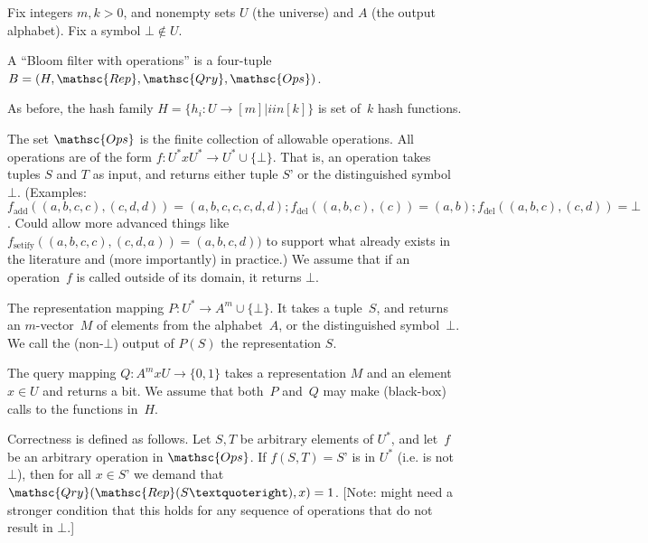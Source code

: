 
Fix integers $m,k > 0$, and nonempty sets $U$ (the universe) and $A$ (the output alphabet).  Fix a symbol $\bot \not\in U$.  

A “Bloom filter with operations” is a four-tuple  $B=(H,\mathsc{Rep},\mathsc{Qry}, \mathsc{Ops})$.  

As before, the hash family $H = \{h_i : U \rightarrow [m]  | i in [k] \}$ is  set of~$k$ hash functions.  

The set $\mathsc{Ops}$ is the finite collection of allowable operations.  All operations are of the form 
$f: U^* x U^* \rightarrow U^* \cup \{\bot\}$.  That is, an operation takes tuples $S$ and $T$ as input, and returns either tuple $S’$ or the distinguished symbol $\bot$.  (Examples: $f_{\mathrm{add}}((a,b,c,c),(c,d,d)) = (a,b,c,c,c,d,d); f_{\mathrm{del}}((a,b,c),(c))=(a,b); f_{\mathrm{del}}((a,b,c),(c,d)) = \bot$.  Could allow more advanced things like $f_{\mathrm{setify}}((a,b,c,c),(c,d,a)) = (a,b,c,d))$ to support what already exists in the literature and (more importantly) in practice.)  We assume that if an operation~$f$ is called outside of its domain, it returns $\bot$.

The representation mapping $P: U^* \rightarrow A^m \cup \{\bot\}$.  It takes a tuple~$S$, and returns an $m$-vector~$M$ of elements from the alphabet~$A$, or the distinguished symbol~$\bot$.  We call the (non-$\bot$) output of $P(S)$ the representation $S$. 

The query mapping $Q: A^m x U \rightarrow \{0,1\}$ takes a representation $M$ and an element $x \in U$ and returns a bit.  We assume that both~$P$ and~$Q$ may make (black-box) calls to the functions in~$H$.  

Correctness is defined as follows.  Let $S,T$ be arbitrary elements of $U^*$, and let~$f$ be an arbitrary operation in $\mathsc{Ops}$.  If $f(S,T) = S’$ is in $U^*$ (i.e. is not $\bot$), then for all $x \in S’$ we demand that $\mathsc{Qry}(\mathsc{Rep}(S’),x)=1$. [Note: might need a stronger condition that this holds for any sequence of operations that do not result in $\bot$.]

